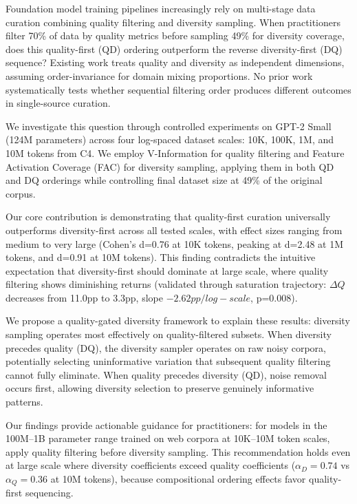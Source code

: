 
Foundation model training pipelines increasingly rely on multi-stage data curation combining quality filtering and diversity sampling. When practitioners filter 70\% of data by quality metrics before sampling 49\% for diversity coverage, does this quality-first (QD) ordering outperform the reverse diversity-first (DQ) sequence? Existing work treats quality and diversity as independent dimensions, assuming order-invariance for domain mixing proportions. No prior work systematically tests whether sequential filtering order produces different outcomes in single-source curation.

We investigate this question through controlled experiments on GPT-2 Small (124M parameters) across four log-spaced dataset scales: 10K, 100K, 1M, and 10M tokens from C4. We employ V-Information for quality filtering and Feature Activation Coverage (FAC) for diversity sampling, applying them in both QD and DQ orderings while controlling final dataset size at 49\% of the original corpus.

Our core contribution is demonstrating that quality-first curation universally outperforms diversity-first across all tested scales, with effect sizes ranging from medium to very large (Cohen's d=0.76 at 10K tokens, peaking at d=2.48 at 1M tokens, and d=0.91 at 10M tokens). This finding contradicts the intuitive expectation that diversity-first should dominate at large scale, where quality filtering shows diminishing returns (validated through saturation trajectory: $\Delta Q$ decreases from 11.0pp to 3.3pp, slope $-2.62pp/log-scale$, p=0.008).

We propose a quality-gated diversity framework to explain these results: diversity sampling operates most effectively on quality-filtered subsets. When diversity precedes quality (DQ), the diversity sampler operates on raw noisy corpora, potentially selecting uninformative variation that subsequent quality filtering cannot fully eliminate. When quality precedes diversity (QD), noise removal occurs first, allowing diversity selection to preserve genuinely informative patterns.

Our findings provide actionable guidance for practitioners: for models in the 100M--1B parameter range trained on web corpora at 10K--10M token scales, apply quality filtering before diversity sampling. This recommendation holds even at large scale where diversity coefficients exceed quality coefficients ($\alpha _{D}=0.74$ vs $\alpha _{Q}=0.36$ at 10M tokens), because compositional ordering effects favor quality-first sequencing.
